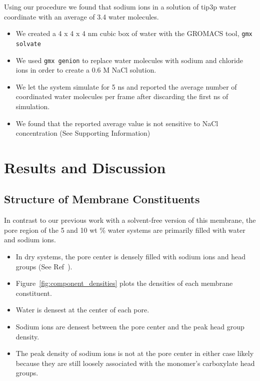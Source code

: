 \documentclass{article}
\begin{document}
  Using our procedure we found that sodium ions in a solution of tip3p water
  coordinate with an average of 3.4 water molecules.
  \begin{itemize}
    \item We created a 4 x 4 x 4 nm cubic box of water with the GROMACS tool,
    \texttt{gmx solvate}
    \item We used \texttt{gmx genion} to replace water molecules with sodium
    and chloride ions in order to create a 0.6 M NaCl solution.
    \item We let the system simulate for 5 ns and reported the average
    number of coordinated water molecules per frame after discarding the first ns of 
    simulation. %
    \item We found that the reported average value is not sensitive to NaCl
    concentration (See Supporting Information)
  \end{itemize}
   
  \section{Results and Discussion}
  
  \subsection*{Structure of Membrane Constituents}\label{section:membrane_components}
  
  
  In contrast to our previous work with a solvent-free version of this membrane, the pore
  region of the 5 and 10 wt \% water systems are primarily filled with water and sodium
  ions.
  \begin{itemize}
    \item In dry systems, the pore center is densely filled with sodium ions and 
    head groups (See Ref~\cite{coscia_understanding_2019}).
    \item Figure~\ref{fig:component_densities} plots the densities of each
    membrane constituent.
    \item Water is densest at the center of each pore. 
    \item Sodium ions are densest between the pore center and the peak head group density.
    \item The peak density of sodium ions is not at the pore center in either case
    likely because they are still loosely associated with the monomer's 
    carboxylate head groups.
  \end{itemize}
  
\end{document}
